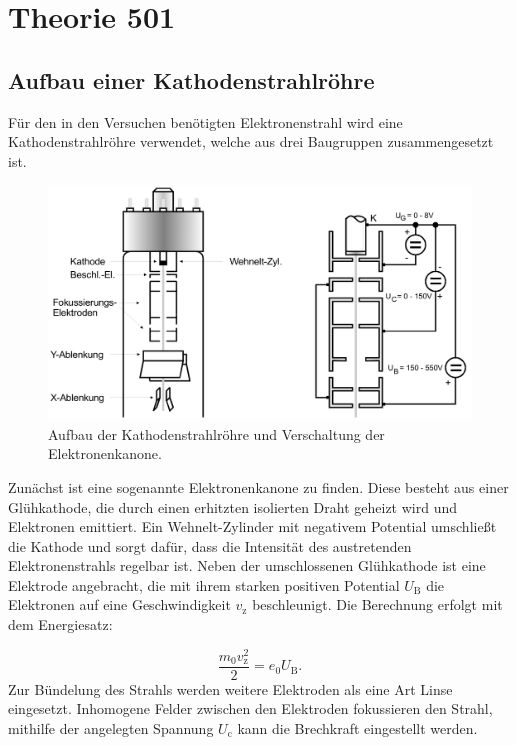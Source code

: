 \section{Theorie 501}
\subsection{Aufbau einer Kathodenstrahlröhre}
Für den in den Versuchen benötigten Elektronenstrahl wird eine Kathodenstrahlröhre verwendet, welche aus drei Baugruppen zusammengesetzt ist.

\begin{figure}[h!]
	\centering
	\includegraphics[width=0.9\linewidth]{kathodeaufbau.png}
	\caption{Aufbau der Kathodenstrahlröhre und Verschaltung der Elektronenkanone.}
	\label{fig:kathodeaufbau}
\end{figure}

Zunächst ist eine sogenannte Elektronenkanone zu finden. Diese besteht aus einer Glühkathode, die durch einen erhitzten isolierten Draht geheizt wird und Elektronen emittiert. Ein Wehnelt-Zylinder mit negativem
Potential umschließt die Kathode und sorgt dafür, dass die Intensität des austretenden Elektronenstrahls regelbar ist. Neben der umschlossenen Glühkathode ist eine Elektrode
angebracht, die mit ihrem starken positiven Potential $U_{\text{B}}$ die Elektronen auf eine Geschwindigkeit $v_{\text{z}}$ beschleunigt. Die Berechnung erfolgt mit dem Energiesatz:

\begin{equation}
\frac{m_0 v_{\text{z}}^2}{2} = e_0 U_{\text{B}}.
\label{eqn:energiesatz}
\end{equation}
Zur Bündelung des Strahls werden weitere Elektroden als eine Art Linse eingesetzt. Inhomogene Felder zwischen den Elektroden fokussieren den Strahl, mithilfe der angelegten Spannung $U_{\text{c}}$
kann die Brechkraft eingestellt werden. 

